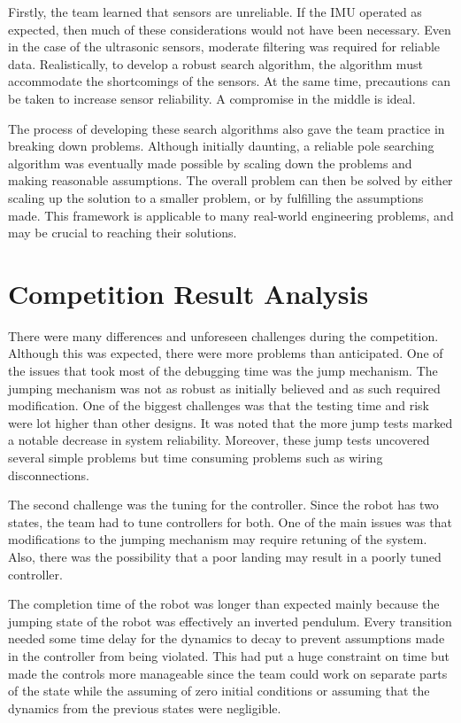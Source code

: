 \documentclass[ece]{uw-wkrpt}
\let\oldsection\section
\renewcommand\section{\clearpage\oldsection}
\begin{document}
Firstly, the team learned that sensors are unreliable. If the IMU operated as expected, then much of these considerations would not have been necessary. Even in the case of the ultrasonic sensors, moderate filtering was required for reliable data. Realistically, to develop a robust search algorithm, the algorithm must accommodate the shortcomings of the sensors. At the same time, precautions can be taken to increase sensor reliability. A compromise in the middle is ideal.

The process of developing these search algorithms also gave the team practice in breaking down problems. Although initially daunting, a reliable pole searching algorithm was eventually made possible by scaling down the problems and making reasonable assumptions. The overall problem can then be solved by either scaling up the solution to a smaller problem, or by fulfilling the assumptions made. This framework is applicable to many real-world engineering problems, and may be crucial to reaching their solutions. 

\section{Competition Result Analysis}

There were many differences and unforeseen challenges during the competition. Although this was expected, there were more problems than anticipated. One of the issues that took most of the debugging time was the jump mechanism. The jumping mechanism was not as robust as initially believed and as such required modification. One of the biggest challenges was that the testing time and risk were lot higher than other designs. It was noted that the more jump tests marked a notable decrease in system reliability. Moreover, these jump tests uncovered several simple problems but time consuming problems such as wiring disconnections.

The second challenge was the tuning for the controller. Since the robot has two states, the team had to tune controllers for both. One of the main issues was that modifications to the jumping mechanism may require retuning of the system. Also, there was the possibility that a poor landing may result in a poorly tuned controller.

The completion time of the robot was longer than expected mainly because the jumping state of the robot was effectively an inverted pendulum. Every transition needed some time delay for the dynamics to decay to prevent assumptions made in the controller from being violated. This had put a huge constraint on time but made the controls more manageable since the team could work on separate parts of the state while the assuming of zero initial conditions or assuming that the dynamics from the previous states were negligible.
\end{document}
